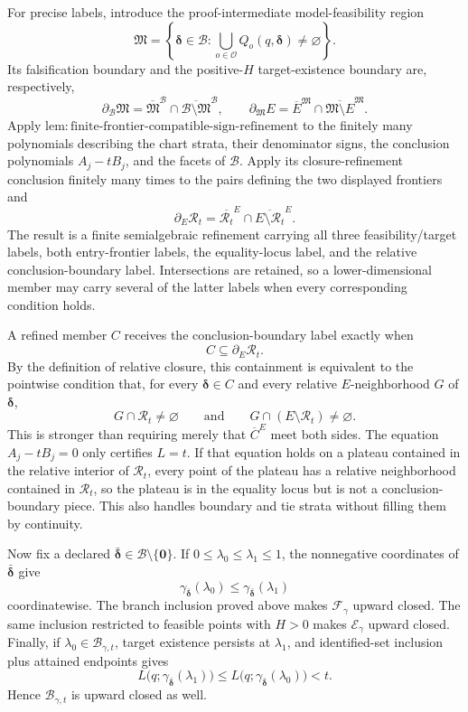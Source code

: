For precise labels, introduce the proof-intermediate model-feasibility region
\[
 \mathfrak M
 =\left\{\boldsymbol\delta\in\mathcal B:
 \bigcup_{o\in\mathcal O}Q_o(q,\boldsymbol\delta)\neq\varnothing\right\}.
\]
Its falsification boundary and the positive-\(H\) target-existence boundary are, respectively,
\[
 \partial_{\mathcal B}\mathfrak M
 =\overline{\mathfrak M}^{\mathcal B}
  \cap\overline{\mathcal B\setminus\mathfrak M}^{\mathcal B},
 \qquad
 \partial_{\mathfrak M}E
 =\overline E^{\mathfrak M}
  \cap\overline{\mathfrak M\setminus E}^{\mathfrak M}.
\]
Apply \(\mathrm{lem:finite\text{-}frontier\text{-}compatible\text{-}sign\text{-}refinement}\) to the finitely many polynomials describing the chart strata, their denominator signs, the conclusion polynomials \(A_j-tB_j\), and the facets of \(\mathcal B\).  Apply its closure-refinement conclusion finitely many times to the pairs defining the two displayed frontiers and
\[
 \partial_E\mathcal R_t
 =\overline{\mathcal R_t}^{E}
  \cap\overline{E\setminus\mathcal R_t}^{E}.
\]
The result is a finite semialgebraic refinement carrying all three feasibility/target labels, both entry-frontier labels, the equality-locus label, and the relative conclusion-boundary label.  Intersections are retained, so a lower-dimensional member may carry several of the latter labels when every corresponding condition holds.

A refined member \(C\) receives the conclusion-boundary label exactly when
\[
 C\subseteq\partial_E\mathcal R_t.
\]
By the definition of relative closure, this containment is equivalent to the pointwise condition that, for every \(\boldsymbol\delta\in C\) and every relative \(E\)-neighborhood \(G\) of \(\boldsymbol\delta\),
\[
 G\cap\mathcal R_t\neq\varnothing
 \qquad\text{and}\qquad
 G\cap(E\setminus\mathcal R_t)\neq\varnothing.
\]
This is stronger than requiring merely that \(\overline C^{E}\) meet both sides.  The equation \(A_j-tB_j=0\) only certifies \(L=t\).  If that equation holds on a plateau contained in the relative interior of \(\mathcal R_t\), every point of the plateau has a relative neighborhood contained in \(\mathcal R_t\), so the plateau is in the equality locus but is not a conclusion-boundary piece.  This also handles boundary and tie strata without filling them by continuity.

Now fix a declared \(\bar{\boldsymbol\delta}\in\mathcal B\setminus\{\boldsymbol0\}\).  If \(0\leq\lambda_0\leq\lambda_1\leq1\), the nonnegative coordinates of \(\bar{\boldsymbol\delta}\) give
\[
 \gamma_{\bar{\boldsymbol\delta}}(\lambda_0)
 \leq
 \gamma_{\bar{\boldsymbol\delta}}(\lambda_1)
\]
coordinatewise.  The branch inclusion proved above makes \(\mathcal F_\gamma\) upward closed.  The same inclusion restricted to feasible points with \(H>0\) makes \(\mathcal E_\gamma\) upward closed.  Finally, if \(\lambda_0\in\mathcal B_{\gamma,t}\), target existence persists at \(\lambda_1\), and identified-set inclusion plus attained endpoints gives
\[
 L\bigl(q;\gamma_{\bar{\boldsymbol\delta}}(\lambda_1)\bigr)
 \leq
 L\bigl(q;\gamma_{\bar{\boldsymbol\delta}}(\lambda_0)\bigr)
 <t.
\]
Hence \(\mathcal B_{\gamma,t}\) is upward closed as well.

